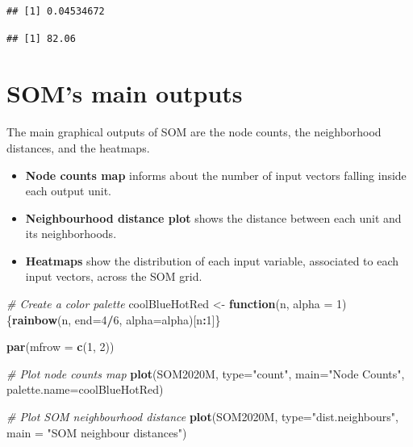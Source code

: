 \documentclass[
]{book}
\newenvironment{Shaded}{\begin{snugshade}}{\end{snugshade}}
\newcommand{\AttributeTok}[1]{\textcolor[rgb]{0.13,0.29,0.53}{#1}}
\newcommand{\CommentTok}[1]{\textcolor[rgb]{0.56,0.35,0.01}{\textit{#1}}}
\newcommand{\ControlFlowTok}[1]{\textcolor[rgb]{0.13,0.29,0.53}{\textbf{#1}}}
\newcommand{\DecValTok}[1]{\textcolor[rgb]{0.00,0.00,0.81}{#1}}
\newcommand{\FunctionTok}[1]{\textcolor[rgb]{0.13,0.29,0.53}{\textbf{#1}}}
\newcommand{\NormalTok}[1]{#1}
\newcommand{\OtherTok}[1]{\textcolor[rgb]{0.56,0.35,0.01}{#1}}
\newcommand{\SpecialCharTok}[1]{\textcolor[rgb]{0.81,0.36,0.00}{\textbf{#1}}}
\newcommand{\StringTok}[1]{\textcolor[rgb]{0.31,0.60,0.02}{#1}}
\begin{document}
\begin{verbatim}
## [1] 0.04534672
\end{verbatim}

\begin{Shaded}
\end{Shaded}

\begin{verbatim}
## [1] 82.06
\end{verbatim}

\hypertarget{soms-main-outputs}{%
\section{SOM's main outputs}\label{soms-main-outputs}}

The main graphical outputs of SOM are the node counts, the neighborhood distances, and the heatmaps.

\begin{itemize}
\item
  \textbf{Node counts map} informs about the number of input vectors falling inside each output unit.
\item
  \textbf{Neighbourhood distance plot} shows the distance between each unit and its neighborhoods.
\item
  \textbf{Heatmaps} show the distribution of each input variable, associated to each input vectors, across the SOM grid.
\end{itemize}

\begin{Shaded}
\begin{Highlighting}[]
\CommentTok{\# Create a color palette}
\NormalTok{coolBlueHotRed }\OtherTok{\textless{}{-}} \ControlFlowTok{function}\NormalTok{(n, }\AttributeTok{alpha =} \DecValTok{1}\NormalTok{) \{}\FunctionTok{rainbow}\NormalTok{(n, }\AttributeTok{end=}\DecValTok{4}\SpecialCharTok{/}\DecValTok{6}\NormalTok{, }\AttributeTok{alpha=}\NormalTok{alpha)[n}\SpecialCharTok{:}\DecValTok{1}\NormalTok{]\}}

\FunctionTok{par}\NormalTok{(}\AttributeTok{mfrow =} \FunctionTok{c}\NormalTok{(}\DecValTok{1}\NormalTok{, }\DecValTok{2}\NormalTok{))}

\CommentTok{\# Plot node counts map}
\FunctionTok{plot}\NormalTok{(SOM2020M, }\AttributeTok{type=}\StringTok{"count"}\NormalTok{, }\AttributeTok{main=}\StringTok{"Node Counts"}\NormalTok{, }\AttributeTok{palette.name=}\NormalTok{coolBlueHotRed)}

\CommentTok{\# Plot SOM neighbourhood distance}
\FunctionTok{plot}\NormalTok{(SOM2020M, }\AttributeTok{type=}\StringTok{"dist.neighbours"}\NormalTok{, }\AttributeTok{main =} \StringTok{"SOM neighbour distances"}\NormalTok{)}
\end{Highlighting}
\end{Shaded}
\end{document}
